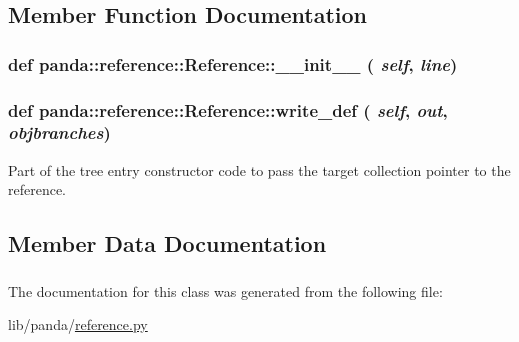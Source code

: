 \subsection{Member Function Documentation}
\hypertarget{classpanda_1_1reference_1_1Reference_a9dc64a390eba2fd603865e85652d12fd}{
\subsubsection[{\_\-\_\-init\_\-\_\-}]{\setlength{\rightskip}{0pt plus 5cm}def panda::reference::Reference::\_\-\_\-init\_\-\_\- ( {\em self}, \/   {\em line})}}
\label{classpanda_1_1reference_1_1Reference_a9dc64a390eba2fd603865e85652d12fd}
\hypertarget{classpanda_1_1reference_1_1Reference_a8ca4bf3bf59ee8e694fc91d50a114a50}{
\subsubsection[{write\_\-def}]{\setlength{\rightskip}{0pt plus 5cm}def panda::reference::Reference::write\_\-def ( {\em self}, \/   {\em out}, \/   {\em objbranches})}}
\label{classpanda_1_1reference_1_1Reference_a8ca4bf3bf59ee8e694fc91d50a114a50}
\begin{DoxyVerb}
Part of the tree entry constructor code to pass the target collection pointer to the reference.
\end{DoxyVerb}
 

\subsection{Member Data Documentation}
\hypertarget{classpanda_1_1reference_1_1Reference_a3408890dda5270567a142feb2e00eeda}{
\subsubsection[{ref\_\-name}]{}}
\label{classpanda_1_1reference_1_1Reference_a3408890dda5270567a142feb2e00eeda}
\hypertarget{classpanda_1_1reference_1_1Reference_a0883ec7ce69e8db3153a91be0b1c2abf}{
\subsubsection[{target}]{}}
\label{classpanda_1_1reference_1_1Reference_a0883ec7ce69e8db3153a91be0b1c2abf}


The documentation for this class was generated from the following file:\begin{DoxyCompactItemize}
\item 
lib/panda/\hyperlink{reference_8py}{reference.py}\end{DoxyCompactItemize}
